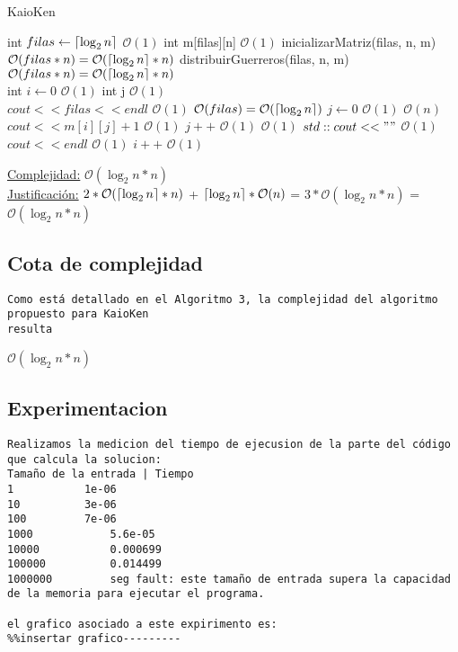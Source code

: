 \documentclass[10pt,a4paper]{article}
\DeclarePairedDelimiter\ceil{\lceil}{\rceil}
\begin{document}
\begin{algorithm}
\caption{KaioKen}
\begin{algorithmic}
	\State int $filas \gets \ceil*{\log_2 n}$ \Comment $\mathcal{O}(1)$
	\State int m[filas][n] \Comment $\mathcal{O}(1)$
	\State inicializarMatriz(filas, n, m) \Comment $\mathcal{O}(filas*n) = \mathcal{O}(\ceil*{\log_2 n}*n)$
	\State distribuirGuerreros(filas, n, m) \Comment $\mathcal{O}(filas*n) = \mathcal{O}(\ceil*{\log_2 n}*n)$
	\\
	\State int $i \gets 0$ \Comment $\mathcal{O}(1)$
	\State int j \Comment $\mathcal{O}(1)$
	\\
	\State $cout << filas << endl$ \Comment $\mathcal{O}(1)$
	 \Comment $\mathcal{O}(filas) = \mathcal{O}(\ceil*{\log_2 n})$
		\State $j \gets 0$ \Comment $\mathcal{O}(1)$
		 \Comment $\mathcal{O}(n)$
			\State $cout << m[i][j]+1$ \Comment $\mathcal{O}(1)$
			\State $j++$ \Comment $\mathcal{O}(1)$
			 \Comment $\mathcal{O}(1)$
				\State $std::cout << " "$ \Comment $\mathcal{O}(1)$
			\EndIf
		\EndWhile
		\State $cout << endl$ \Comment $\mathcal{O}(1)$
		\State $i++$ \Comment $\mathcal{O}(1)$
	\EndWhile
\EndFunction
\end{algorithmic}
\underline{Complejidad:} $\mathcal{O}(\log _{2} n * n)$\\
    \underline{Justificación:} $ 2 * \mathcal{O}(\ceil*{\log_2 n}*n)$ + $ \ceil*{\log_2 n} * \mathcal{O}(n)$ = $3*\mathcal{O}(\log _{2} n * n)$ = $\mathcal{O}(\log _{2} n * n)$\\
\end{algorithm}


\newpage
\subsection{Cota de complejidad}
\begin{verbatim}
Como está detallado en el Algoritmo 3, la complejidad del algoritmo propuesto para KaioKen
resulta
\end{verbatim}
$\mathcal{O}(\log _{2} n * n)$\\

\subsection{Experimentacion}
\begin{verbatim}
Realizamos la medicion del tiempo de ejecusion de la parte del código que calcula la solucion:
Tamaño de la entrada | Tiempo
1			1e-06
10			3e-06
100			7e-06
1000			5.6e-05
10000			0.000699
100000			0.014499
1000000			seg fault: este tamaño de entrada supera la capacidad de la memoria para ejecutar el programa.

el grafico asociado a este expirimento es:
%%insertar grafico---------
\end{verbatim}
\end{document}
